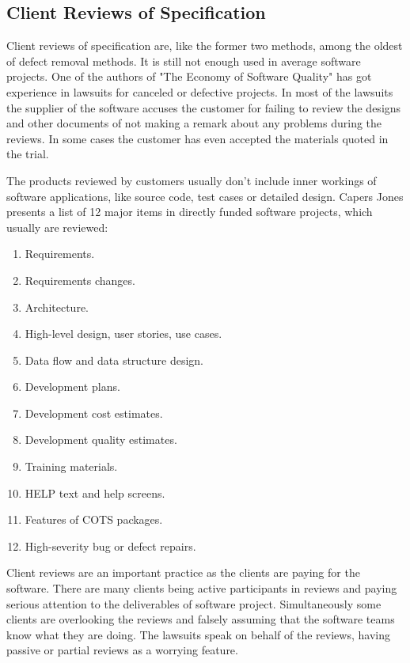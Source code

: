 \subsection{Client Reviews of Specification} 
\label{subsec:clientreview}

Client reviews of specification are, like the former two methods, among the oldest of defect removal methods. It is still not enough used in average software projects. One of the authors of "The Economy of Software Quality" has got experience in lawsuits for canceled or defective projects. In most of the lawsuits the supplier of the software accuses the customer for failing to review the designs and other documents of not making a remark about any problems during the reviews. In some cases the customer has even accepted the materials quoted in the trial.

The products reviewed by customers usually don't include inner workings of software applications, like source code, test cases or detailed design. Capers Jones presents a list of 12 major items in directly funded software projects, which usually are reviewed:


\begin{enumerate}
	\item Requirements.
	\item Requirements changes.
	\item Architecture.
	\item High-level design, user stories, use cases.
	\item Data flow and data structure design.
	\item Development plans.
	\item Development cost estimates.
	\item Development quality estimates.
	\item Training materials.
	\item HELP text and help screens.
	\item Features of COTS packages.
	\item High-severity bug or defect repairs.
\end{enumerate}

Client reviews are an important practice as the clients are paying for the software. There are many clients being active participants in reviews and paying serious attention to the deliverables of software project. Simultaneously some clients are overlooking the reviews and falsely assuming that the software teams know what they are doing. The lawsuits speak on behalf of the reviews, having passive or partial reviews as a worrying feature.

